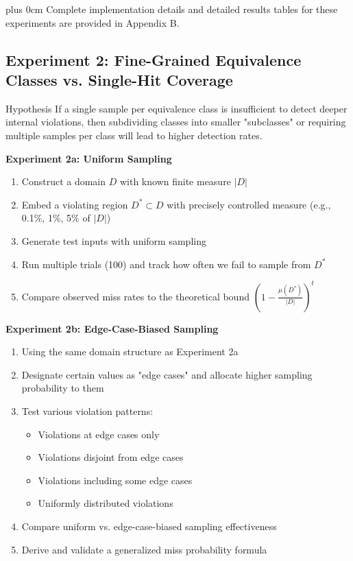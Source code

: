 \documentclass[11pt,a4paper]{article}
\newcommand{\justifytext}{\leftskip=0pt \rightskip=0pt plus 0cm}
\begin{document}
\justifytext
Complete implementation details and detailed results tables for these experiments are provided in Appendix B.

\subsection{Experiment 2: Fine-Grained Equivalence Classes vs. Single-Hit Coverage}
\label{subsec:experiment2}

\begin{theorembox}{Hypothesis}
If a single sample per equivalence class is insufficient to detect deeper internal violations, then subdividing classes into smaller "subclasses" or requiring multiple samples per class will lead to higher detection rates.
\end{theorembox}

\begin{tcolorbox}[
  colback=blue!5!white,
  colframe=blue!75!black,
  title=Experimental Design,
  fonttitle=\bfseries
]

\textbf{Experiment 2a: Uniform Sampling}
\begin{enumerate}
\item Construct a domain $D$ with known finite measure $|D|$
\item Embed a violating region $D^* \subset D$ with precisely controlled measure (e.g., 0.1\%, 1\%, 5\% of $|D|$)
\item Generate test inputs with uniform sampling
\item Run multiple trials (100) and track how often we fail to sample from $D^*$
\item Compare observed miss rates to the theoretical bound $\left(1 - \frac{\mu(D^*)}{|D|}\right)^t$
\end{enumerate}

\textbf{Experiment 2b: Edge-Case-Biased Sampling}
\begin{enumerate}
\item Using the same domain structure as Experiment 2a
\item Designate certain values as "edge cases" and allocate higher sampling probability to them
\item Test various violation patterns:
   \begin{itemize}
   \item Violations at edge cases only
   \item Violations disjoint from edge cases
   \item Violations including some edge cases
   \item Uniformly distributed violations
   \end{itemize}
\item Compare uniform vs. edge-case-biased sampling effectiveness
\item Derive and validate a generalized miss probability formula
\end{enumerate}
\end{tcolorbox}
\end{document}
